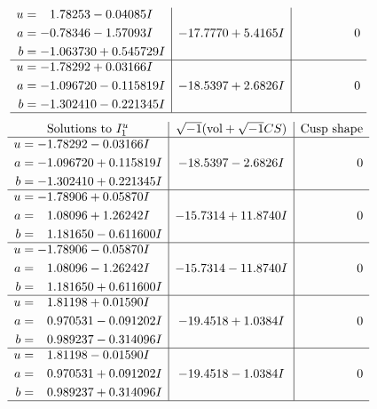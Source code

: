 \documentclass[1p]{elsarticle_modified}
\theoremstyle{definition}
\newcommand{\I}{\sqrt{-1}}
\begin{document}
$$\begin{array}{c|c|c}
\begin{aligned}
u &= \phantom{-}1.78253 - 0.04085 I \\
a &= -0.78346 - 1.57093 I \\
b &= -1.063730 + 0.545729 I\end{aligned}
 & -17.7770 + 5.4165 I & \phantom{-0.000000 } 0 \\ \hline\begin{aligned}
u &= -1.78292 + 0.03166 I \\
a &= -1.096720 - 0.115819 I \\
b &= -1.302410 - 0.221345 I\end{aligned}
 & -18.5397 + 2.6826 I & \phantom{-0.000000 } 0\\
 \hline 
 \end{array}$$\newpage$$\begin{array}{c|c|c}  
\text{Solutions to }I^u_{1}& \I (\text{vol} + \sqrt{-1}CS) & \text{Cusp shape}\\
 \hline 
\begin{aligned}
u &= -1.78292 - 0.03166 I \\
a &= -1.096720 + 0.115819 I \\
b &= -1.302410 + 0.221345 I\end{aligned}
 & -18.5397 - 2.6826 I & \phantom{-0.000000 } 0 \\ \hline\begin{aligned}
u &= -1.78906 + 0.05870 I \\
a &= \phantom{-}1.08096 + 1.26242 I \\
b &= \phantom{-}1.181650 - 0.611600 I\end{aligned}
 & -15.7314 + 11.8740 I & \phantom{-0.000000 } 0 \\ \hline\begin{aligned}
u &= -1.78906 - 0.05870 I \\
a &= \phantom{-}1.08096 - 1.26242 I \\
b &= \phantom{-}1.181650 + 0.611600 I\end{aligned}
 & -15.7314 - 11.8740 I & \phantom{-0.000000 } 0 \\ \hline\begin{aligned}
u &= \phantom{-}1.81198 + 0.01590 I \\
a &= \phantom{-}0.970531 - 0.091202 I \\
b &= \phantom{-}0.989237 - 0.314096 I\end{aligned}
 & -19.4518 + 1.0384 I & \phantom{-0.000000 } 0 \\ \hline\begin{aligned}
u &= \phantom{-}1.81198 - 0.01590 I \\
a &= \phantom{-}0.970531 + 0.091202 I \\
b &= \phantom{-}0.989237 + 0.314096 I\end{aligned}
 & -19.4518 - 1.0384 I & \phantom{-0.000000 } 0\\
 \hline 
 \end{array}$$\newpage\newpage\renewcommand{\arraystretch}{1}
\end{document}
